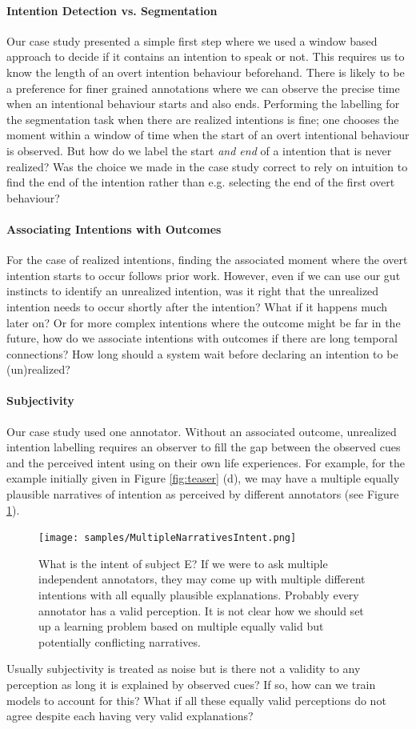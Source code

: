 \documentclass[manuscript,screen,review]{acmart}
\begin{document}
\paragraph {Intention Detection vs. Segmentation}
Our case study presented a simple first step where we used a window based approach to decide if it contains an intention to speak or not. This requires us to know the length of an overt intention behaviour beforehand. There is likely to be a preference for finer grained annotations where we can observe the precise time when an intentional behaviour starts and also ends. Performing the labelling for the segmentation task when there are realized intentions is fine; one chooses the moment within a window of time when the start of an overt intentional behaviour is observed. But how do we label the start \emph{and end} of a intention that is never realized? Was the choice we made in the case study correct to rely on intuition to find the end of the intention rather than e.g. selecting the end of the first overt behaviour?

\paragraph {Associating Intentions with Outcomes}
For the case of realized intentions, finding the associated moment where the overt intention starts to occur follows prior work. However, even if we can use our gut instincts to identify an unrealized intention, was it right that the unrealized intention needs to occur shortly after the intention? What if it happens much later on? Or for more complex intentions where the outcome might be far in the future, how do we associate intentions with outcomes if there are long temporal connections? How long should a system wait before declaring an intention to be (un)realized? 
\paragraph {Subjectivity}
Our case study used one annotator. Without an associated outcome, unrealized intention labelling requires an observer to fill the gap between the observed cues and the perceived intent using on their own life experiences. For example, for the example initially given in Figure \ref{fig:teaser} (d), we may have a multiple equally plausible narratives of intention as perceived by different annotators (see Figure \ref{fig:multiintent}). 
\begin{figure}
    \centering
    \texttt{[image: samples/MultipleNarrativesIntent.png]}
    \caption{What is the intent of subject E? If we were to ask multiple independent annotators, they may come up with multiple different intentions with all equally plausible explanations. Probably every annotator has a valid perception. It is not clear how we should set up a learning problem based on multiple equally valid but potentially conflicting narratives.}
    \label{fig:multiintent}
\end{figure}
Usually subjectivity is treated as noise but is there not a validity to any perception as long it is explained by observed cues? If so, how can we train models to account for this? What if all these equally valid perceptions do not agree despite each having very valid explanations?
\end{document}
